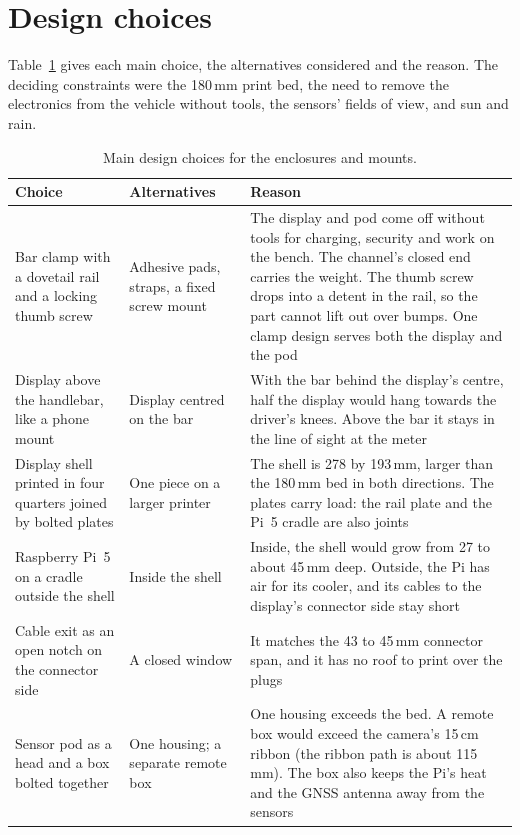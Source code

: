 \section{Design choices}
\label{sec:mech-choices}

Table~\ref{tab:mech-choices} gives each main choice, the alternatives considered and the reason. The deciding constraints were the 180\,mm print bed, the need to remove the electronics from the vehicle without tools, the sensors' fields of view, and sun and rain.

\begin{table}[htbp]
\centering
\caption[Main design choices for the enclosures and mounts]{Main design choices for the enclosures and mounts.}
\label{tab:mech-choices}
\small
\begin{tabular}{|p{3.4cm}|p{3.6cm}|p{7.4cm}|}
\hline
\textbf{Choice} & \textbf{Alternatives} & \textbf{Reason} \\ \hline
Bar clamp with a dovetail rail and a locking thumb screw & Adhesive pads, straps, a fixed screw mount & The display and pod come off without tools for charging, security and work on the bench. The channel's closed end carries the weight. The thumb screw drops into a detent in the rail, so the part cannot lift out over bumps. One clamp design serves both the display and the pod \\ \hline
Display above the handlebar, like a phone mount & Display centred on the bar & With the bar behind the display's centre, half the display would hang towards the driver's knees. Above the bar it stays in the line of sight at the meter \\ \hline
Display shell printed in four quarters joined by bolted plates & One piece on a larger printer & The shell is 278 by 193\,mm, larger than the 180\,mm bed in both directions. The plates carry load: the rail plate and the Pi~5 cradle are also joints \\ \hline
Raspberry Pi~5 on a cradle outside the shell & Inside the shell & Inside, the shell would grow from 27 to about 45\,mm deep. Outside, the Pi has air for its cooler, and its cables to the display's connector side stay short \\ \hline
Cable exit as an open notch on the connector side & A closed window & It matches the 43 to 45\,mm connector span, and it has no roof to print over the plugs \\ \hline
Sensor pod as a head and a box bolted together & One housing; a separate remote box & One housing exceeds the bed. A remote box would exceed the camera's 15\,cm ribbon (the ribbon path is about 115\,mm). The box also keeps the Pi's heat and the GNSS antenna away from the sensors \\ \hline

\end{tabular}
\end{table}
